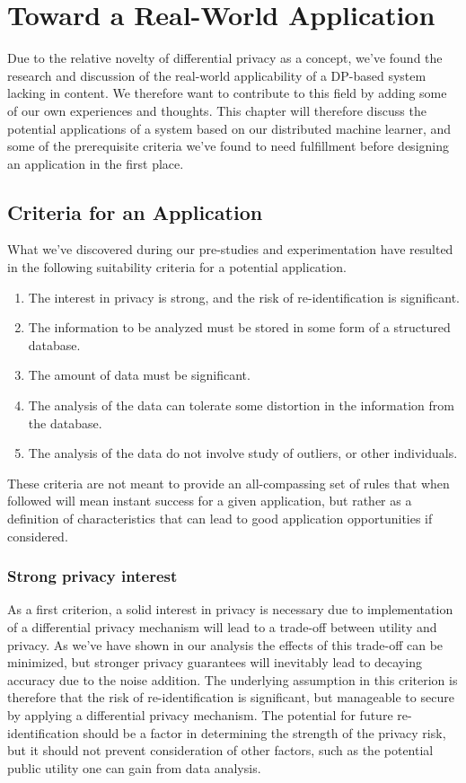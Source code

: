 \chapter{Toward a Real-World Application} \label{ch:RW_application}
Due to the relative novelty of differential privacy as a concept, we've found the research and discussion of the real-world applicability of a DP-based system lacking in content. We therefore want to contribute to this field by adding some of our own experiences and thoughts.  This chapter will therefore discuss the potential applications of a system based on our distributed machine learner, and some of the prerequisite criteria we've found to need fulfillment before designing an application in the first place.   

\section{Criteria for an Application} \label{sec:suitability_criteria}
What we've discovered during our pre-studies and experimentation have resulted in the following suitability criteria for a potential application. 
\begin{enumerate}
	\item The interest in privacy is strong, and the risk of re-identification is significant.
	\item The information to be analyzed must be stored in some form of a structured database.
	\item The amount of data must be significant.
	\item The analysis of the data can tolerate some distortion in the information from the database.
	\item The analysis of the data do not involve study of outliers, or other individuals.
\end{enumerate}
These criteria are not meant to provide an all-compassing set of rules that when followed will mean instant success for a given application, but rather as a definition of characteristics that can lead to good application opportunities if considered.  

\subsection{Strong privacy interest}
As a first criterion, a solid interest in privacy is necessary due to implementation of a differential privacy mechanism will lead to a trade-off between utility and privacy. As we've have shown in our analysis the effects of this trade-off can be minimized, but stronger privacy guarantees will inevitably lead to decaying accuracy due to the noise addition. The underlying assumption in this criterion is therefore that the risk of re-identification is significant, but manageable to secure by applying a differential privacy mechanism. The potential for future re-identification should be a factor in determining the strength of the privacy risk, but it should not prevent consideration of other factors, such as the potential public utility one can gain from data analysis.


